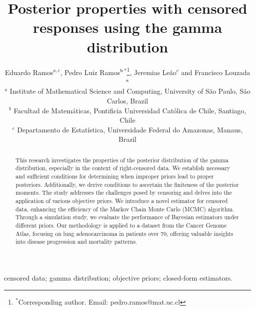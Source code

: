 \documentclass[]{interact}
\theoremstyle{plain}%
\theoremstyle{definition}
\theoremstyle{remark}
\begin{document}

\title{Posterior properties with censored responses using the gamma distribution}

\author{Eduardo Ramos$^{a,c}$, Pedro Luiz Ramos$^{\rm b}$$^{\ast}$\thanks{$^\ast$Corresponding author. Email: pedro.ramos@mat.uc.cl
\vspace{6pt}}, 
Jeremias Le\~ao$^{c}$
and 
Francisco Louzada$^{\rm a}$ \\\vspace{6pt} 
$^{a}$ {Institute of Mathematical Science and Computing, University of S\~ao Paulo, S\~ao Carlos, Brazil} \\%
$^{b}$ {Facultad de Matem\'aticas, Pontificia Universidad Cat\'olica
de Chile, Santiago, Chile}\\
$^{c}$ {Departamento de Estat\'istica, Universidade Federal do Amazonas, Manaus, Brazil} 
}




\maketitle

\begin{abstract}

This research investigates the properties of the posterior distribution of the gamma distribution, especially in the context of right-censored data. We establish necessary and sufficient conditions for determining when improper priors lead to proper posteriors. Additionally, we derive conditions to ascertain the finiteness of the posterior moments. The study addresses the challenges posed by censoring and delves into the application of various objective priors. We introduce a novel estimator for censored data, enhancing the efficiency of the Markov Chain Monte Carlo (MCMC) algorithm. Through a simulation study, we evaluate the performance of Bayesian estimators under different priors. Our methodology is applied to a dataset from the Cancer Genome Atlas, focusing on lung adenocarcinoma in patients over 70, offering valuable insights into disease progression and mortality patterns.



\end{abstract}

\begin{keywords}
censored data; gamma distribution; objective priors; closed-form estimators.
\end{keywords}
\end{document}
